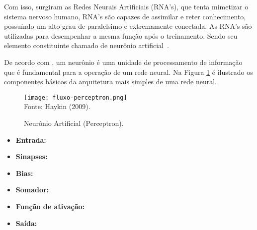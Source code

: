     Com isso, surgiram as Redes Neurais Artificiais (RNA's), que tenta mimetizar o sistema nervoso humano, RNA's são capazes de
    assimilar e reter conhecimento, possuíndo um alto grau de paralelsimo e extremamente conectada. As RNA's são utilizadas para
    desempenhar a mesma função após o treinamento. Sendo seu elemento constituinte chamado de neurônio artificial~\cite{ulinick2019}.

    De acordo com , um neurônio é uma unidade de processamento de informação que é fundamental para a operação de um
    rede neural. Na Figura \ref{fig:fluxo-perceptron} é ilustrado os componentes básicos da arquitetura mais simples de uma rede neural.
    \begin{figure}[!htb]
        \centering
        \caption{Neurônio Artificial (Perceptron).}
        \texttt{[image: fluxo-perceptron.png]}\\
        {\footnotesize Fonte: Haykin (2009).}\
        \label{fig:fluxo-perceptron}
    \end{figure}
    
    \begin{itemize}
        \item \textbf{Entrada: }
        \item \textbf{Sinapses: }
        \item \textbf{Bias: }
        \item \textbf{Somador: }
        \item \textbf{Função de ativação: }
        \item \textbf{Saída: }
    
    \end{itemize}

